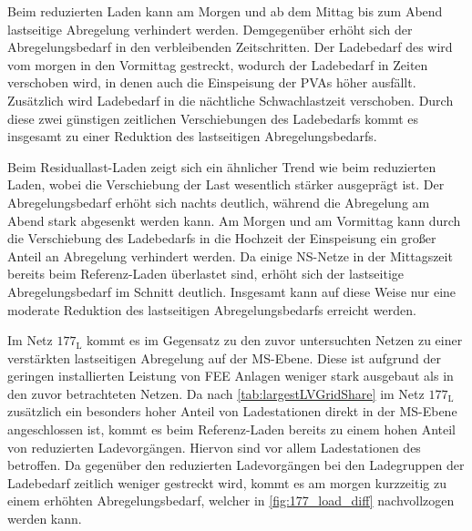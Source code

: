 Beim reduzierten Laden kann am Morgen und ab dem Mittag bis zum Abend lastseitige Abregelung verhindert werden.
Demgegenüber erhöht sich der Abregelungsbedarf in den verbleibenden Zeitschritten.
Der Ladebedarf des \UC \Firmeparkplatz wird vom morgen in den Vormittag gestreckt, wodurch der Ladebedarf in Zeiten verschoben wird, in denen auch die Einspeisung der \glspl{PVA} höher ausfällt.
Zusätzlich wird Ladebedarf \zH in die nächtliche Schwachlastzeit verschoben.
Durch diese zwei günstigen zeitlichen Verschiebungen des Ladebedarfs kommt es insgesamt zu einer Reduktion des lastseitigen Abregelungsbedarfs.



Beim Residuallast-Laden zeigt sich ein ähnlicher Trend wie beim reduzierten Laden, wobei die Verschiebung der Last wesentlich stärker ausgeprägt ist.
Der Abregelungsbedarf erhöht sich nachts deutlich, während die Abregelung am Abend stark abgesenkt werden kann.
Am Morgen und am Vormittag kann durch die Verschiebung des Ladebedarfs in die Hochzeit der Einspeisung ein großer Anteil an Abregelung verhindert werden.
Da einige \gls{NS}-Netze in der Mittagszeit bereits beim Referenz-Laden überlastet sind, erhöht sich der lastseitige Abregelungsbedarf im Schnitt deutlich.
Insgesamt kann auf diese Weise nur eine moderate Reduktion des lastseitigen Abregelungsbedarfs erreicht werden.\medskip

Im Netz \(177_{\text{L}}\) kommt es im Gegensatz zu den zuvor untersuchten Netzen zu einer verstärkten lastseitigen Abregelung auf der \gls{MS}-Ebene.
Diese ist aufgrund der geringen installierten Leistung von \gls{FEE} Anlagen weniger stark ausgebaut als in den zuvor betrachteten Netzen.
Da nach \autoref{tab:largestLVGridShare} im Netz \(177_{\text{L}}\) zusätzlich ein besonders hoher Anteil von Ladestationen direkt in der \gls{MS}-Ebene angeschlossen ist, kommt es beim Referenz-Laden bereits zu einem hohen Anteil von reduzierten Ladevorgängen.
Hiervon sind vor allem Ladestationen des \UCs \Firmeparkplatz betroffen.
Da gegenüber den reduzierten Ladevorgängen bei den Ladegruppen der Ladebedarf zeitlich weniger gestreckt wird, kommt es am morgen kurzzeitig zu einem erhöhten Abregelungsbedarf, welcher in \autoref{fig:177_load_diff} nachvollzogen werden kann.



